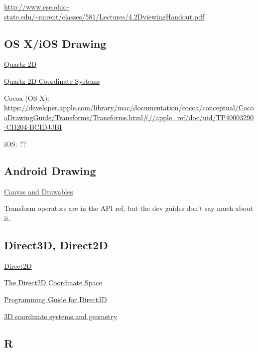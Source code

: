\documentclass[12pt]{tufte-handout}
\numberwithin{equation}{subsection}
\numberwithin{equation}{subsection}
\begin{document}
\begin{appendices}
    \url{http://www.cse.ohio-state.edu/~parent/classes/581/Lectures/4.2DviewingHandout.pdf}

    \subsection{OS X/iOS Drawing}

    \href{https://developer.apple.com/library/mac/documentation/graphicsimaging/conceptual/drawingwithquartz2d/dq\_overview/dq\_overview.html}{Quartz 2D}

    \href{https://developer.apple.com/library/mac/documentation/graphicsimaging/conceptual/drawingwithquartz2d/dq\_overview/dq\_overview.html#//apple\_ref/doc/uid/TP30001066-CH202-CJBBAEEC}{Quartz 2D Coordinate Systems}

    Cocoa (OS X):  \url{https://developer.apple.com/library/mac/documentation/cocoa/conceptual/CocoaDrawingGuide/Transforms/Transforms.html#//apple\_ref/doc/uid/TP40003290-CH204-BCIDJJBI}

    iOS:  ??

    \subsection{Android Drawing}

    \href{http://developer.android.com/guide/topics/graphics/2d-graphics.html}{Canvas and Drawables}

    Transform operators are in the API ref, but the dev guides don't say much about it.

    \subsection{Direct3D, Direct2D}
    \label{subs:direct3d}


    \href{http://msdn.microsoft.com/en-us/library/dd370990%28VS.85%29.aspx}{Direct2D}

      \href{http://msdn.microsoft.com/en-us/library/dd756655(v=vs.85).aspx#the_direct2d_coordinate_space}{The Direct2D Coordinate Space}

      \href{http://msdn.microsoft.com/en-us/library/windows/desktop/ff476345(v=vs.85).aspx}{Programming Guide for Direct3D}

      \href{http://msdn.microsoft.com/en-us/library/windows/desktop/bb324489(v=vs.85).aspx}{3D coordinate systems and geometry}

      \subsection{R}
      \label{subs:r}


\end{appendices}
\end{document}
